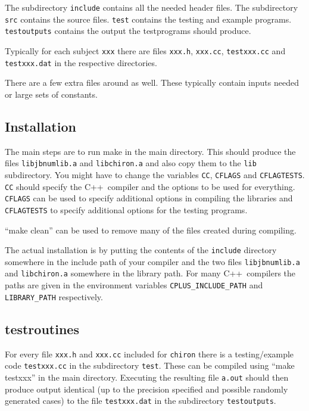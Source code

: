 \documentclass[12pt,a4paper]{article}
\newcommand{\mytt}[1]{\texttt{#1}}
\newcommand{\cpp}{\textsc{C++}}
\begin{document}
The subdirectory \mytt{include} contains all the needed header files.
The subdirectory \mytt{src} contains the source files. \mytt{test} contains
the testing and example programs. \mytt{testoutputs} contains the output
the testprograms should produce.

Typically for each subject \mytt{xxx} there are files \mytt{xxx.h},
\mytt{xxx.cc}, \mytt{testxxx.cc} and \mytt{testxxx.dat} in the
respective directories.

There are a few extra files around as well. These typically contain
inputs needed or large sets of constants.

\subsection{Installation}
\label{installation}

The main steps are to run make in the main directory.
This should produce the files \mytt{libjbnumlib.a} and \mytt{libchiron.a}
and also copy them to the \mytt{lib} subdirectory.
You might have to change the variables \mytt{CC}, \mytt{CFLAGS} and
\mytt{CFLAGTESTS}. \mytt{CC} should specify the \cpp\
compiler and the options to be used for everything.
\mytt{CFLAGS} can be used to specify additional options in compiling the
libraries and \mytt{CFLAGTESTS} to specify additional options
for the testing programs.

``make clean'' can be used to remove many of the files created during compiling.

The actual installation is by putting the contents of the \mytt{include}
directory somewhere in the include path of your compiler and the two
files \mytt{libjbnumlib.a} and \mytt{libchiron.a} somewhere in the library
path. For many \cpp\ compilers the paths are given in the environment
variables \mytt{CPLUS\_INCLUDE\_PATH} and \mytt{LIBRARY\_PATH} respectively.

\subsection{testroutines}
\label{testroutines}

For every file \mytt{xxx.h} and \mytt{xxx.cc} included for \mytt{chiron}
there is a testing/example code \mytt{testxxx.cc} in the subdirectory
\mytt{test}. These can be compiled using ``make testxxx'' in the main directory.
Executing the resulting file \mytt{a.out} should then produce output
identical (up to the precision specified and possible randomly generated
cases) to the file \mytt{testxxx.dat} in the subdirectory \mytt{testoutputs}.
\end{document}
